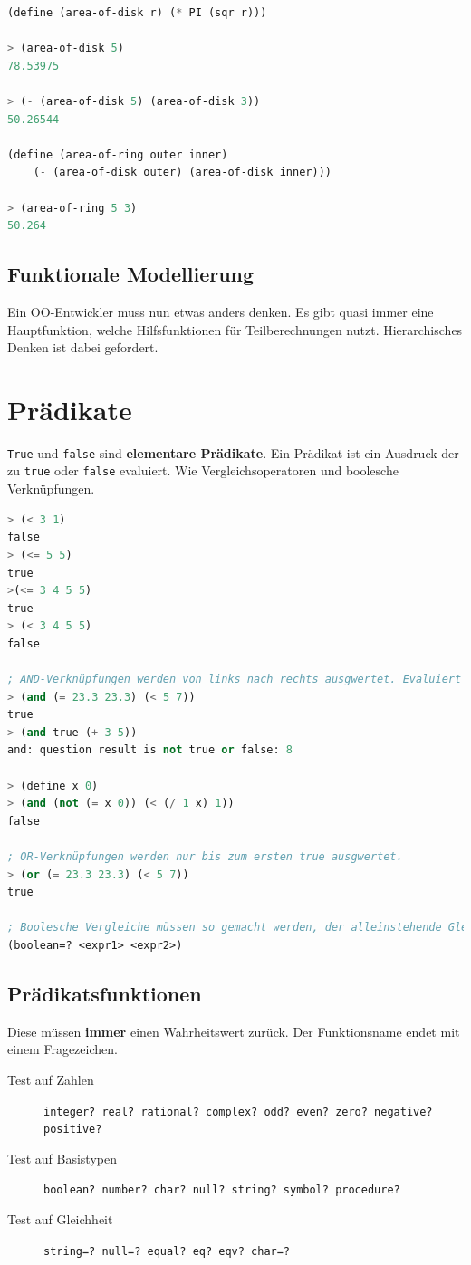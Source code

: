 \begin{lstlisting}[language=Lisp, caption=Beispiel Funktionen]
(define (area-of-disk r) (* PI (sqr r)))

> (area-of-disk 5)
78.53975

> (- (area-of-disk 5) (area-of-disk 3))
50.26544

(define (area-of-ring outer inner)
	(- (area-of-disk outer) (area-of-disk inner)))

> (area-of-ring 5 3)
50.264
\end{lstlisting}

\subsection{Funktionale Modellierung}
Ein OO-Entwickler muss nun etwas anders denken. Es gibt quasi immer eine Hauptfunktion, welche Hilfsfunktionen für Teilberechnungen nutzt. Hierarchisches Denken ist dabei gefordert.

\section{Prädikate}
\verb|True| und \verb|false| sind \textbf{elementare Prädikate}. Ein Prädikat ist ein Ausdruck der zu \verb|true| oder \verb|false| evaluiert. Wie Vergleichsoperatoren und boolesche Verknüpfungen.
\begin{lstlisting}[language=Lisp, caption=Prädikate]
> (< 3 1)
false
> (<= 5 5)
true
>(<= 3 4 5 5)
true
> (< 3 4 5 5)
false

; AND-Verknüpfungen werden von links nach rechts ausgwertet. Evaluiert ein Ausdruck links zu false, dann wird die Auswertung beendet. Falls ein Ausdruck keinen booleschen Wert zurückgibt, kommt es zum Laufzeitfehler.
> (and (= 23.3 23.3) (< 5 7))
true
> (and true (+ 3 5))
and: question result is not true or false: 8

> (define x 0)
> (and (not (= x 0)) (< (/ 1 x) 1))
false

; OR-Verknüpfungen werden nur bis zum ersten true ausgwertet.
> (or (= 23.3 23.3) (< 5 7))
true

; Boolesche Vergleiche müssen so gemacht werden, der alleinstehende Gleich-Operator ist nur für Zahlen!
(boolean=? <expr1> <expr2>)
\end{lstlisting}

\subsection{Prädikatsfunktionen}
Diese müssen \textbf{immer} einen Wahrheitswert zurück. Der Funktionsname endet mit einem Fragezeichen.
\begin{description}
	\item[Test auf Zahlen] \verb|integer? real? rational? complex? odd? even? zero? negative? positive?|
	\item[Test auf Basistypen] \verb|boolean? number? char? null? string? symbol? procedure?|
	\item[Test auf Gleichheit] \verb|string=? null=? equal? eq? eqv? char=?|
\end{description}

